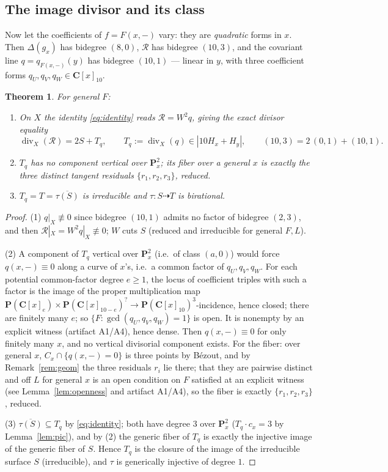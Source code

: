 \documentclass[11pt]{amsart}
\newtheorem{theorem}{Theorem}[section]
\theoremstyle{definition}
\theoremstyle{remark}
\newcommand{\PP}{\mathbf{P}}
\newcommand{\CC}{\mathbf{C}}
\newcommand{\divi}{\operatorname{div}}
\newcommand{\Hx}{H_x}
\newcommand{\Hy}{H_y}
\newcommand{\calR}{\mathcal{R}}
\begin{document}
\subsection{The image divisor and its class}

Now let the coefficients of $f=F(x,-)$ vary: they are \emph{quadratic}
forms in $x$.  Then $\Delta(g_x)$ has bidegree $(8,0)$, $\calR$ has
bidegree $(10,3)$, and the covariant line $q=q_{F(x,-)}(y)$ has bidegree
$(10,1)$ --- linear in $y$, with three coefficient forms
$q_U,q_V,q_W\in\CC[x]_{10}$.

\begin{theorem}\label{thm:class}
For general $F$:
\begin{enumerate}
\item On $X$ the identity \eqref{eq:identity} reads $\calR=W^2q$, giving
the exact divisor equality
\[
\divi_X(\calR)=2S+T_q,\qquad
T_q:=\divi_X(q)\in|10\Hx+\Hy|,\qquad (10,3)=2\,(0,1)+(10,1).
\]
\item $T_q$ has no component vertical over $\PP^2_x$; its fiber over a
general $x$ is exactly the three distinct tangent residuals
$\{r_1,r_2,r_3\}$, reduced.
\item $T_q=T=\overline{\tau(S)}$ is irreducible and
$\tau\colon S\dashrightarrow T$ is birational.
\end{enumerate}
\end{theorem}

\begin{proof}
(1) $q|_X\not\equiv0$ since bidegree $(10,1)$ admits no factor of bidegree
$(2,3)$, and then $\calR|_X=W^2q|_X\not\equiv0$; $W$ cuts $S$ (reduced and
irreducible for general $F,L$).

(2) A component of $T_q$ vertical over $\PP^2_x$ (i.e.\ of class $(a,0)$)
would force $q(x,-)\equiv0$ along a curve of $x$'s, i.e.\ a common factor
of $q_U,q_V,q_W$.  For each potential common-factor degree $e\ge1$, the
locus of coefficient triples with such a factor is the image of the proper
multiplication map
$\PP(\CC[x]_e)\times\PP(\CC[x]_{10-e})^{?}\to\PP(\CC[x]_{10})^{3}$-incidence,
hence closed; there are finitely many $e$; so
$\{F:\gcd(q_U,q_V,q_W)=1\}$ is open.  It is nonempty by an explicit
witness (artifact A1/A4), hence dense.  Then $q(x,-)\equiv 0$ for only
finitely many $x$, and no vertical divisorial component exists.  For the
fiber: over general $x$, $C_x\cap\{q(x,-)=0\}$ is three points by
B\'ezout, and by Remark~\ref{rem:geom} the three residuals $r_i$ lie
there; that they are pairwise distinct and off $L$ for general $x$ is an
open condition on $F$ satisfied at an explicit witness (see
Lemma~\ref{lem:openness} and artifact A1/A4), so the fiber is exactly
$\{r_1,r_2,r_3\}$, reduced.

(3) $\overline{\tau(S)}\subseteq T_q$ by \eqref{eq:identity}; both have
degree $3$ over $\PP^2_x$ ($T_q\cdot c_x=3$ by Lemma~\ref{lem:pic}), and
by (2) the generic fiber of $T_q$ is exactly the injective image of the
generic fiber of $S$.  Hence $T_q$ is the closure of the image of the
irreducible surface $S$ (irreducible), and $\tau$ is generically injective
of degree $1$.
\end{proof}
\end{document}
